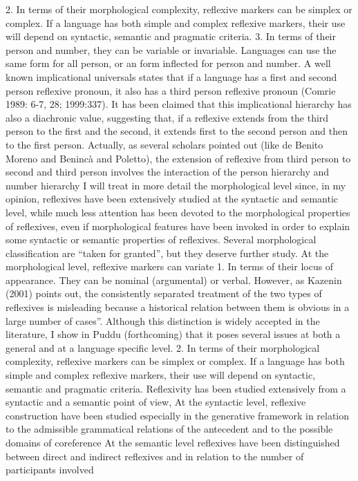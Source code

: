 \documentclass[output=paper]{langscibook}
\begin{document}
 
2. In terms of their morphological complexity, reflexive markers can be simplex or complex. If a language has both simple and complex reflexive markers, their use will depend on syntactic, semantic and pragmatic criteria.
3. In terms of their person and number, they can be variable or invariable. Languages can use the same form for all person, or an form inflected for person and number. A well known implicational universals states that if a language has a first and second person reflexive pronoun, it also has a third person reflexive pronoun (Comrie 1989: 6-7, 28; 1999:337). 
 It has been claimed that this implicational hierarchy has also a diachronic value, suggesting that, if a reflexive extends from the third person to the first and the second, it extends first to the second person and then to the first person. Actually, as several scholars pointed out (like de Benito Moreno and Benincà and Poletto), the extension of reflexive from third person to second and third person involves the interaction of the person hierarchy and number hierarchy
I will treat in more detail the morphological level since, in my opinion, reflexives have been extensively studied at the syntactic and semantic level, while much less attention has been devoted to the morphological properties of reflexives, even if morphological features have been invoked in order to explain some syntactic or semantic properties of reflexives. Several morphological classification are “taken for granted”, but they deserve further study.
At the morphological level, reflexive markers can variate
1. In terms of their locus of appearance. They can be nominal (argumental) or verbal. However, as Kazenin (2001) points out, the consistently separated treatment of the two types of reflexives is misleading because a historical relation between them is obvious in a large number of cases”. Although this distinction is widely accepted in the literature, I show in Puddu (forthcoming) that it poses several issues at both a general and at a language specific level. 
2. In terms of their morphological complexity, reflexive markers can be simplex or complex. If a language has both simple and complex reflexive markers, their use will depend on syntactic, semantic and pragmatic criteria.
Reflexivity has been studied extensively from a syntactic and a semantic point of view,
At the syntactic level, reflexive construction have been studied especially in the generative framework in relation to the admissible grammatical relations of the antecedent and to the possible domains of coreference
At the semantic level reflexives have been distinguished between direct and indirect reflexives and in relation to the number of participants involved
\end{document}
